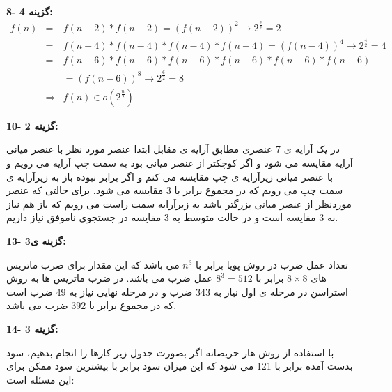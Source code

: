 \documentclass[12pt,fleqn,a4paper]{article}
\begin{document}
{\bf 8- گزینه 4:}
\begin{eqnarray*}
f(n)
&=& f(n-2) * f(n-2) = \left(f(n-2)\right)^2 \to 2^\frac22=2 \\
&=& f(n-4) * f(n-4) * f(n-4) * f(n-4) = \left(f(n-4)\right)^4 \to 2^\frac42=4 \\
&=& f(n-6) * f(n-6) * f(n-6) * f(n-6) *f(n-6) * f(n-6) \\
&& =\left(f(n-6)\right)^8 \to 2^\frac62=8 \\
&\Longrightarrow& f(n)\in o(2^\frac{n}{2})
\end{eqnarray*}

{\bf 10- گزینه 2:}


در یک آرایه ی 7 عنصری مطابق آرایه ی مقابل ابتدا عنصر مورد نظر با عنصر میانی آرایه مقایسه می شود و اگر کوچکتر از عنصر میانی بود به سمت چپ آرایه می رویم و با عنصر میانی زیرآرایه ی چپ مقایسه می کنم و اگر برابر نبوده باز به زیرآرایه ی سمت چپ می رویم که در مجموع برابر با 3 مقایسه می شود. 
برای حالتی که عنصر موردنظر از عنصر میانی بزرگتر باشد به زیرآرایه سمت راست می رویم که باز هم نیاز به 3 مقایسه است و در حالت متوسط به 3 مقایسه در جستجوی ناموفق نیاز داریم.

{\bf 13- گزینه ی3:}

تعداد عمل ضرب در روش پویا برابر با $n^3$ می باشد که این مقدار برای ضرب ماتریس های $8\times8$ برابر با $8^3=512$ عمل ضرب می باشد. در ضرب ماتریس ها به روش استراسن در مرحله ی اول نیاز به 343 ضرب و در مرحله نهایی نیاز به 49 ضرب است که در مجموع برابر با 392 ضرب می باشد.

{\bf 14- گزینه 3:}

با استفاده از روش هار حریصانه اگر بصورت جدول زیر کارها را انجام بدهیم، سود بدست آمده برابر با 121 می شود که این میزان سود برابر با بیشترین سود ممکن برای این مسئله است:
\end{document}
